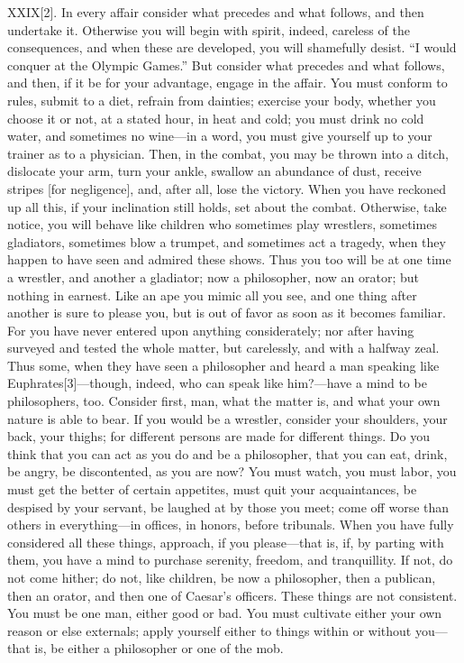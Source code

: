 \documentclass[a4paper]{article}
\begin{document}
XXIX[2]. In every affair consider what precedes and what follows, and then
undertake it. Otherwise you will begin with spirit, indeed, careless of
the consequences, and when these are developed, you will shamefully
desist. “I would conquer at the Olympic Games.” But consider what
precedes and what follows, and then, if it be for your advantage, engage
in the affair. You must conform to rules, submit to a diet, refrain from
dainties; exercise your body, whether you choose it or not, at a stated
hour, in heat and cold; you must drink no cold water, and sometimes no
wine—in a word, you must give yourself up to your trainer as to a
physician. Then, in the combat, you may be thrown into a ditch, dislocate
your arm, turn your ankle, swallow an abundance of dust, receive stripes
[for negligence], and, after all, lose the victory. When you have
reckoned up all this, if your inclination still holds, set about the
combat. Otherwise, take notice, you will behave like children who
sometimes play wrestlers, sometimes gladiators, sometimes blow a trumpet,
and sometimes act a tragedy, when they happen to have seen and admired
these shows. Thus you too will be at one time a wrestler, and another a
gladiator; now a philosopher, now an orator; but nothing in earnest. Like
an ape you mimic all you see, and one thing after another is sure to
please you, but is out of favor as soon as it becomes familiar. For you
have never entered upon anything considerately; nor after having surveyed
and tested the whole matter, but carelessly, and with a halfway zeal.
Thus some, when they have seen a philosopher and heard a man speaking
like Euphrates[3]—though, indeed, who can speak like him?—have a mind to
be philosophers, too. Consider first, man, what the matter is, and what
your own nature is able to bear. If you would be a wrestler, consider
your shoulders, your back, your thighs; for different persons are made
for different things. Do you think that you can act as you do and be a
philosopher, that you can eat, drink, be angry, be discontented, as you
are now? You must watch, you must labor, you must get the better of
certain appetites, must quit your acquaintances, be despised by your
servant, be laughed at by those you meet; come off worse than others in
everything—in offices, in honors, before tribunals. When you have fully
considered all these things, approach, if you please—that is, if, by
parting with them, you have a mind to purchase serenity, freedom, and
tranquillity. If not, do not come hither; do not, like children, be now a
philosopher, then a publican, then an orator, and then one of Caesar’s
officers. These things are not consistent. You must be one man, either
good or bad. You must cultivate either your own reason or else externals;
apply yourself either to things within or without you—that is, be either
a philosopher or one of the mob.
\end{document}
